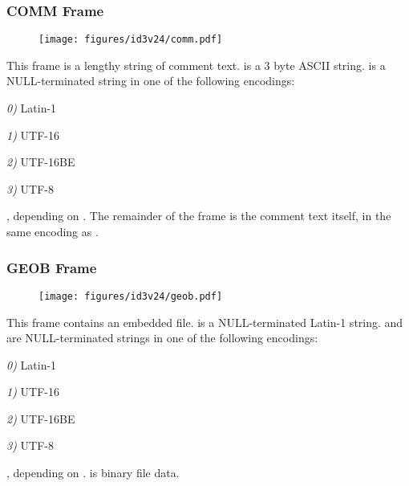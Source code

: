 \clearpage

\subsubsection{COMM Frame}
\begin{figure}[h]
\texttt{[image: figures/id3v24/comm.pdf]}
\end{figure}
This frame is a lengthy string of comment text.
 is a 3 byte ASCII string.
 is a NULL-terminated string
in one of the following encodings:
\begin{inparaenum}
\item[\itshape 0\upshape)] Latin-1
\item[\itshape 1\upshape)] UTF-16
\item[\itshape 2\upshape)] UTF-16BE
\item[\itshape 3\upshape)] UTF-8
\end{inparaenum}
, depending on .
The remainder of the frame is the comment text itself,
in the same encoding as .

\subsubsection{GEOB Frame}
\begin{figure}[h]
\texttt{[image: figures/id3v24/geob.pdf]}
\end{figure}
This frame contains an embedded file.
 is a NULL-terminated Latin-1 string.
 and  are NULL-terminated
strings in one of the following encodings:
\begin{inparaenum}
\item[\itshape 0\upshape)] Latin-1
\item[\itshape 1\upshape)] UTF-16
\item[\itshape 2\upshape)] UTF-16BE
\item[\itshape 3\upshape)] UTF-8
\end{inparaenum}
, depending on .
 is binary file data.

\clearpage

